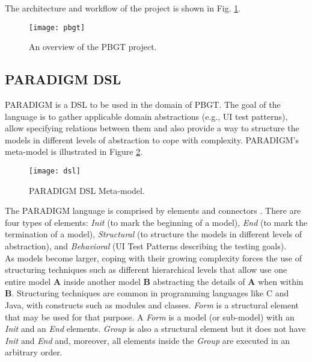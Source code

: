 The architecture and workflow of the project is shown in Fig. \ref{fig:pbgt}.\\

\begin{figure}[!htb]
\centering
\texttt{[image: pbgt]}
\caption{An overview of the PBGT project.}
\label{fig:pbgt}
\end{figure}

\subsection{PARADIGM DSL}\label{sec:dsl}

PARADIGM is a DSL to be used in the domain of PBGT. The goal of the language is to gather applicable domain abstractions (e.g., UI test patterns), allow specifying relations between them and also provide a way to structure the models in different levels of abstraction to cope with complexity. PARADIGM's meta-model is illustrated in Figure \ref{fig:dsl}.\\

\begin{figure}[!htb]
\centering
\texttt{[image: dsl]}
\caption{PARADIGM DSL Meta-model.}
\label{fig:dsl}
\end{figure}

The PARADIGM language is comprised by elements and connectors \cite{moreira2013pattern}. There are four types of elements: \textit{Init} (to mark the beginning of a model), \textit{End} (to mark the termination of a model), \textit{Structural} (to structure the models in different levels of abstraction), and \textit{Behavioral} (UI Test Patterns describing the testing goals).\\

As models become larger, coping with their growing complexity forces the use of structuring techniques such as different hierarchical levels that allow use one entire model \textbf{A} inside another model \textbf{B} abstracting the details of \textbf{A} when within \textbf{B}. Structuring techniques are common in programming languages like C and Java, with constructs such as modules and classes. \textit{Form} is a structural element that may be used for that purpose. A \textit{Form} is a model (or sub-model) with an \textit{Init} and an \textit{End} elements. \textit{Group} is also a structural element but it does not have \textit{Init} and \textit{End} and, moreover, all elements inside the \textit{Group} are executed in an arbitrary order.\\

